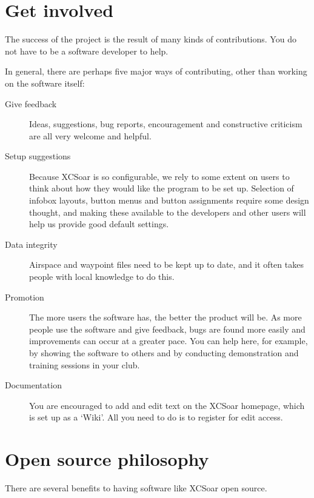 \documentclass[a4paper,12pt]{refrep}
\begin{document}
\section{Get involved}

The success of the project is the result of many kinds of
contributions.  You do not have to be a software developer to help.

In general, there are perhaps five major ways of contributing, other
than working on the software itself:
\begin{description}
\item[Give feedback]
Ideas, suggestions, bug reports, encouragement and
constructive criticism are all very welcome and helpful.
\item[Setup suggestions]
Because XCSoar is so configurable, we rely to some extent on users to
think about how they would like the program to be set up.  Selection
of infobox layouts, button menus and button assignments require some
design thought, and making these available to the developers and other
users will help us provide good default settings.
\item[Data integrity]
Airspace and waypoint files need to be kept up to date, and it often
takes people with local knowledge to do this.
\item[Promotion]  The more users the software has, the better
 the product will be.  As more people use the software and give
 feedback, bugs are found more easily and improvements can occur at a
 greater pace.  You can help here, for example, by showing the
 software to others and by conducting demonstration and training
 sessions in your club.
\item[Documentation]  You are encouraged to add and edit text on the
XCSoar homepage, which is set up as a `Wiki'.  All you need to do is
to register for edit access.
\end{description}

\section{Open source philosophy}

There are several benefits to having software like XCSoar open source.
\end{document}

